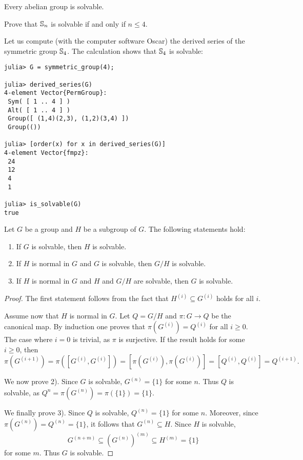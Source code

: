 Every abelian group is solvable. 

\begin{exercise}
    Prove that $\mathbb{S}_n$ is solvable if and only if $n\leq4$. 
\end{exercise}

Let us compute (with the computer software Oscar) 
the derived series of the symmetric group
$\mathbb{S}_4$. The calculation shows that $\mathbb{S}_4$ is solvable: 
\begin{lstlisting}
julia> G = symmetric_group(4);

julia> derived_series(G)
4-element Vector{PermGroup}:
 Sym( [ 1 .. 4 ] )
 Alt( [ 1 .. 4 ] )
 Group([ (1,4)(2,3), (1,2)(3,4) ])
 Group(())
 
julia> [order(x) for x in derived_series(G)]
4-element Vector{fmpz}:
 24
 12
 4
 1
 
julia> is_solvable(G)
true
\end{lstlisting}

\begin{proposition}
\label{pro:solvable}
    Let $G$ be a group and $H$ be a subgroup of $G$. 
    The following statements hold:
    \begin{enumerate}
        \item If $G$ is solvable, then $H$ is solvable.
        \item If $H$ is normal in $G$ and $G$ is solvable, then $G/H$ is solvable. 
        \item If $H$ is normal in $G$ and $H$ and $G/H$ are solvable, then $G$ is solvable. 
    \end{enumerate}
\end{proposition}

\begin{proof}
    The first statement follows from the fact that
    $H^{(i)}\subseteq G^{(i)}$ holds for all $i$. 
 
    Assume now that $H$ is normal in $G$. 
    Let $Q=G/H$ and $\pi\colon G\to Q$ be the canonical map.
    By induction one proves that $\pi(G^{(i)})=Q^{(i)}$ for all $i\geq0$.
    The case where $i=0$ is trivial, as $\pi$ is surjective. 
    If the result holds for some $i\geq0$, then
    \[
            \pi(G^{(i+1)})=\pi([G^{(i)},G^{(i)}])=[\pi(G^{(i)}),\pi(G^{(i)})]=[Q^{(i)},Q^{(i)}]=Q^{(i+1)}.
    \]

    We now prove 2). Since $G$ is solvable, $G^{(n)}=\{1\}$ for some $n$. 
    Thus $Q$ is solvable, as $Q^{n}=\pi(G^{(n)})=\pi(\{1\})=\{1\}$. 

    We finally prove 3). 
    Since $Q$ is solvable, $Q^{(n)}=\{1\}$ for some $n$.
    Moreover, since $\pi(G^{(n)})=Q^{(n)}=\{1\}$, it follows that
    $G^{(n)}\subseteq H$. Since $H$
    is solvable, 
    \[
        G^{(n+m)}\subseteq (G^{(n)})^{(m)}\subseteq H^{(m)}=\{1\}
    \]
    for some $m$. Thus $G$ is solvable.
\end{proof}

